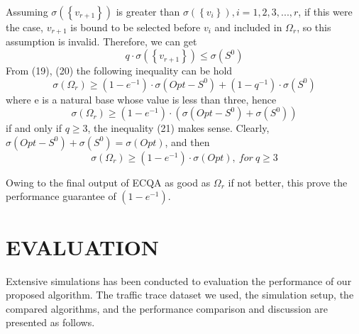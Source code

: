 \documentclass[journal]{IEEEtran}
\begin{document}
Assuming $\sigma\left(\left \{ v_{r+1} \right \}\right)$ is greater than $\sigma\left ( \left \{ v_{i} \right \} \right),i=1,2,3,...,r$, if this were the case, $v_{r+1}$ is bound to be selected before $v_{i}$ and included in $\Omega _{r}$, so this assumption is invalid. Therefore, we can get
\begin{equation}
q\cdot \sigma \left ( \left \{ v_{r+1} \right \} \right )\leqslant \sigma \left ( S^{0} \right )
\end{equation}
From (19), (20) the following inequality can be hold
\begin{equation}
\sigma \left ( \Omega _{r} \right )\geqslant \left ( 1-e^{-1} \right )\cdot \sigma (Opt-S^{0})+(1-q^{-1})\cdot \sigma (S^{0})
\end{equation}
where e is a natural base whose value is less than three, hence
\begin{equation}
\sigma \left ( \Omega _{r} \right )\geqslant \left ( 1-e^{-1} \right )\cdot (\sigma (Opt-S^{0})+\sigma (S^{0}))
\end{equation}
if and only if $q\geqslant 3$, the inequality (21) makes sense. Clearly, $\sigma(Opt-S^{0})+\sigma (S^{0})=\sigma (Opt)$, and then
\begin{equation}
\sigma(\Omega_{r})\geqslant (1-e^{-1})\cdot \sigma(Opt), \ for \ q\geqslant 3
\end{equation}

Owing to the final output of ECQA as good as $\Omega_{r}$ if not better, this prove the performance guarantee of $(1-e^{-1})$.


\section{EVALUATION}
Extensive simulations has been conducted to evaluation the performance of our proposed algorithm. The traffic trace dataset we used, the simulation setup, the compared algorithms, and the performance comparison and discussion are presented as follows.
\end{document}
